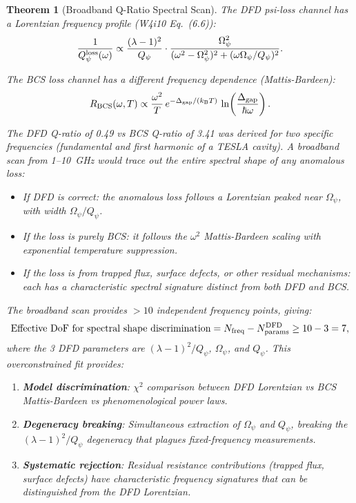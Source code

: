 \documentclass[11pt]{article}
\newcommand{\lam}{\lambda}
\newcommand{\Opsi}{\Omega_\psi}
\newcommand{\kB}{k_{\mathrm{B}}}
\newcommand{\Qpsi}{Q_\psi}
\newtheorem{theorem}{Theorem}[section]
\theoremstyle{definition}
\theoremstyle{remark}
\begin{document}
\begin{theorem}[Broadband Q-Ratio Spectral Scan]
\label{thm:broadband}
The DFD psi-loss channel has a Lorentzian frequency profile
(W4i10 Eq.~(6.6)):
\begin{equation}
\frac{1}{Q_\psi^{\rm loss}(\omega)} \propto
\frac{(\lam-1)^2}{\Qpsi}\cdot
\frac{\Opsi^2}{(\omega^2 - \Opsi^2)^2 + (\omega\Opsi/\Qpsi)^2}.
\label{eq:lorentzian_repeat}
\end{equation}

The BCS loss channel has a \emph{different} frequency dependence
(Mattis-Bardeen):
\begin{equation}
R_{\rm BCS}(\omega, T) \propto \frac{\omega^2}{T}\,
e^{-\Delta_{\rm gap}/(\kB T)}\,\ln\!\left(\frac{\Delta_{\rm gap}}
{\hbar\omega}\right).
\label{eq:BCS}
\end{equation}

The DFD Q-ratio of 0.49 vs BCS Q-ratio of 3.41 was derived for
\emph{two specific frequencies} (fundamental and first harmonic of
a TESLA cavity). A broadband scan from 1--10~GHz would trace out
the \emph{entire} spectral shape of any anomalous loss:

\begin{itemize}[nosep]
\item If DFD is correct: the anomalous loss follows a Lorentzian
  peaked near $\Opsi$, with width $\Opsi/\Qpsi$.
\item If the loss is purely BCS: it follows the $\omega^2$ Mattis-Bardeen
  scaling with exponential temperature suppression.
\item If the loss is from trapped flux, surface defects, or other
  residual mechanisms: each has a characteristic spectral signature
  distinct from both DFD and BCS.
\end{itemize}

The broadband scan provides $>10$ independent frequency points, giving:
\begin{equation}
\text{Effective DoF for spectral shape discrimination}
= N_{\rm freq} - N_{\rm params}^{\rm DFD} \geq 10 - 3 = 7,
\label{eq:dof}
\end{equation}
where the 3 DFD parameters are $(\lam-1)^2/\Qpsi$, $\Opsi$, and
$\Qpsi$. This overconstrained fit provides:

\begin{enumerate}[nosep]
\item \textbf{Model discrimination}: $\chi^2$ comparison between DFD
  Lorentzian vs BCS Mattis-Bardeen vs phenomenological power laws.
\item \textbf{Degeneracy breaking}: Simultaneous extraction of $\Opsi$
  and $\Qpsi$, breaking the $(\lam-1)^2/\Qpsi$ degeneracy that plagues
  fixed-frequency measurements.
\item \textbf{Systematic rejection}: Residual resistance contributions
  (trapped flux, surface defects) have characteristic frequency
  signatures that can be distinguished from the DFD Lorentzian.
\end{enumerate}
\end{theorem}
\end{document}

